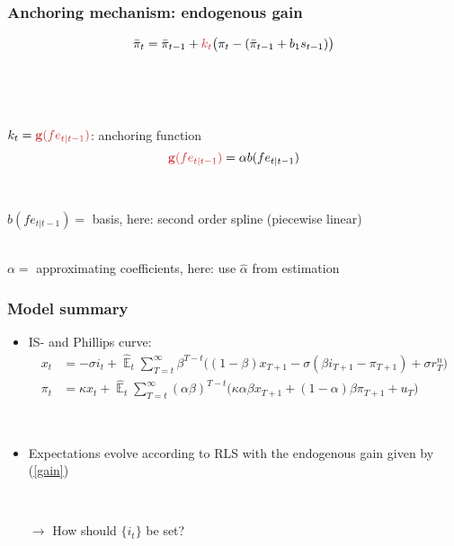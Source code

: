 \documentclass[10pt]{beamer}
\DeclareMathOperator{\E}{\mathbb{E}}
\begin{document}
\begin{frame}
	\frametitle{Anchoring mechanism: endogenous gain}
	\label{anchoring1}


\begin{equation}
\bar{\pi}_{t}  =\bar{\pi}_{t-1} + \textcolor{brownreddark}{k_t}\big(\pi_{t} -(\bar{\pi}_{t-1}+b_1 s_{t-1}) \big)
\end{equation}

\

\

$k_t = \textcolor{brownreddark}{\mathbf{g}(fe_{t|t-1})}$: anchoring function
\pause
\begin{equation}
 \textcolor{brownreddark}{\mathbf{g}(fe_{t|t-1})} = \alpha b(fe_{t|t-1})\label{gain}
\end{equation}

\

$ b(fe_{t|t-1}) = $ basis, here: second order spline (piecewise linear) \\

\

$\alpha  = $ approximating coefficients, here: use $\hat{\alpha}$ from estimation

\vfill 

\hfill \hyperlink{g}{}



\end{frame}

\begin{frame}
	\frametitle{Model summary}
	\label{aggregate_LOMS}
\begin{itemize}
\item IS- and Phillips curve:	
 \begin{align}
x_t &=  -\sigma i_t +\hat{\E}_t \sum_{T=t}^{\infty} \beta^{T-t }\big( (1-\beta)x_{T+1} - \sigma(\beta i_{T+1} - \pi_{T+1}) +\sigma r_T^n \big)  \label{NKIS}  \\
\pi_t &= \kappa x_t +\hat{\E}_t \sum_{T=t}^{\infty} (\alpha\beta)^{T-t }\big( \kappa \alpha \beta x_{T+1} + (1-\alpha)\beta \pi_{T+1} + u_T\big) \label{NKPC} 
\end{align}
\hfill \hyperlink{derivations}{} \hyperlink{ALMs}{}

\

\item  Expectations evolve according to RLS with the endogenous gain given by (\ref{gain})

\

\item[$\rightarrow$] How should $\{ i_t \}$ be set?
\end{itemize}



\end{frame}
\end{document}
